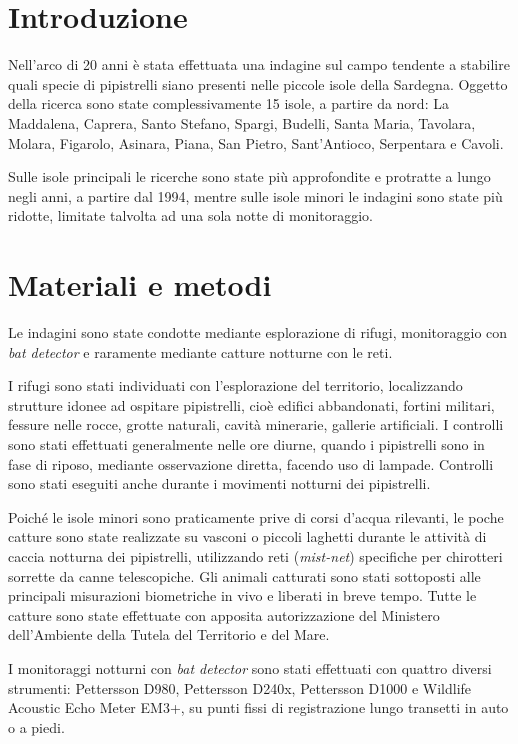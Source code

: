 \begin{multicols}{2}

\section*{Introduzione}
Nell'arco di 20 anni è stata effettuata una indagine sul campo tendente a stabilire quali specie di pipistrelli siano presenti nelle piccole isole della Sardegna. Oggetto della ricerca sono state complessivamente 15 isole, a partire da nord: La Maddalena, Caprera, Santo Stefano, Spargi, Budelli, Santa Maria, Tavolara, Molara, Figarolo, Asinara, Piana, San Pietro, Sant’Antioco, Serpentara e Cavoli.

Sulle isole principali le ricerche sono state più approfondite e protratte a lungo negli anni, a partire dal 1994, mentre sulle isole minori le indagini sono state più ridotte, limitate talvolta ad una sola notte di monitoraggio.

\section*{Materiali e metodi}
Le indagini sono state condotte mediante esplorazione di rifugi, monitoraggio con \textit{bat detector} e raramente mediante catture notturne con le reti.

I rifugi sono stati individuati con l’esplorazione del territorio, localizzando strutture idonee ad ospitare pipistrelli, cioè edifici abbandonati, fortini militari, fessure nelle rocce, grotte naturali, cavità minerarie, gallerie artificiali. I controlli sono stati effettuati generalmente nelle ore diurne, quando i pipistrelli sono in fase di riposo, mediante osservazione diretta, facendo uso di lampade. Controlli sono stati eseguiti anche durante i movimenti notturni dei pipistrelli.

Poiché le isole minori sono praticamente prive di corsi d’acqua rilevanti, le poche catture sono state realizzate su vasconi o piccoli laghetti durante le attività di caccia notturna dei pipistrelli, utilizzando reti (\textit{mist-net}) specifiche per chirotteri sorrette da canne telescopiche. Gli animali catturati sono stati sottoposti alle principali misurazioni biometriche in vivo e liberati in breve tempo. Tutte le catture sono state effettuate con apposita autorizzazione del Ministero dell’Ambiente della Tutela del Territorio e del Mare. 

I monitoraggi notturni con \textit{bat detector} sono stati effettuati con quattro diversi strumenti: Pettersson D980, Pettersson D240x, Pettersson D1000 e Wildlife Acoustic Echo Meter EM3+, su punti fissi di registrazione lungo transetti in auto o a piedi.


\end{multicols}
